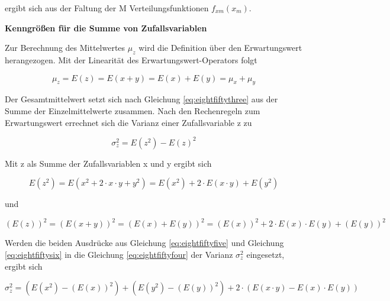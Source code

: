 \noindent ergibt sich aus der Faltung der M Verteilungsfunktionen $f_{xm}(x_{m})$.\bigskip

{\selectfont
\noindent\textbf{Kenngr\"{o}{\ss}en f\"{u}r die Summe von Zufallsvariablen}}\smallskip

\noindent Zur Berechnung des Mittelwertes $\mu_{z}$ wird die Definition \"{u}ber den Erwartungswert herangezogen. Mit der Linearit\"{a}t des Erwartungswert-Operators folgt 

\begin{equation}\label{eq:eightfiftythree}
\mu _{z} =E(z)=E(x+y)=E(x)+E(y)=\mu _{x} +\mu _{y}
\end{equation}

\noindent Der Gesamtmittelwert setzt sich nach Gleichung \eqref{eq:eightfiftythree} aus der Summe der Einzelmittelwerte zusammen. Nach den Rechenregeln zum Erwartungswert errechnet sich die Varianz einer Zufallsvariable z zu

\begin{equation}\label{eq:eightfiftyfour}
\sigma _{z}^{2} =E(z^{2})-E(z)^{2}
\end{equation}

\noindent Mit z als Summe der Zufallsvariablen x und y ergibt sich

\begin{equation}\label{eq:eightfiftyfive}
E(z^{2})=E\left(x^{2} +2\cdot x\cdot y+y^{2} \right)=E\left(x^{2} \right)+2\cdot E(x\cdot y)+E\left(y^{2} \right)
\end{equation}

\noindent und

\begin{equation}\label{eq:eightfiftysix}
\left(E(z)\right)^{2} =\left(E(x+y)\right)^{2} =\left(E(x)+E(y)\right)^{2} =\left(E(x)\right)^{2} +2\cdot E(x)\cdot E(y)+\left(E(y)\right)^{2}
\end{equation}

\noindent Werden die beiden Ausdr\"{u}cke aus Gleichung \eqref{eq:eightfiftyfive} und Gleichung \eqref{eq:eightfiftysix} in die Gleichung \eqref{eq:eightfiftyfour} der Varianz $\sigma_{z}^{2}$ eingesetzt, ergibt sich

\begin{equation}\label{eq:eightfiftyseven}
\sigma _{z}^{2} =\left(E\left(x^{2} \right)-\left(E(x)\right)^{2} \right)+\left(E\left(y^{2} \right)-\left(E(y)\right)^{2} \right)+2\cdot \left(E\left(x\cdot y\right)-E(x)\cdot E(y)\right)
\end{equation}

